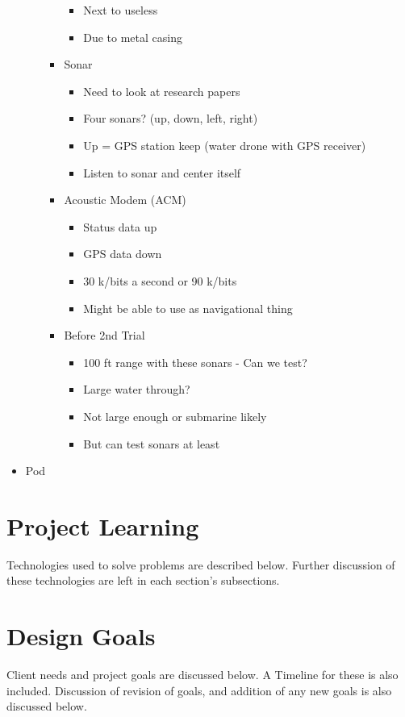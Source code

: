 \documentclass[12pt]{article}
\begin{document}
\begin{itemize}
\begin{itemize}
\begin{itemize}
\begin{itemize}
							\item Next to useless
							\item Due to metal casing
						\end{itemize}
						\item Sonar
						\begin{itemize}
							\item Need to look at research papers
							\item Four sonars? (up, down, left, right)
							\item Up = GPS station keep (water drone with GPS receiver)
							\item Listen to sonar and center itself
						\end{itemize}
						\item Acoustic Modem (ACM)
						\begin{itemize}
							\item Status data up
							\item GPS data down
							\item 30 k/bits a second or 90 k/bits
							\item Might be able to use as navigational thing
						\end{itemize}
						\item Before 2nd Trial
						\begin{itemize}
							\item 100 ft range with these sonars - Can we test?
							\item Large water through?
							\item Not large enough or submarine likely
							\item But can test sonars at least
						\end{itemize}
					\end{itemize}
				\end{itemize}
				\item Pod
				
			\end{itemize}

		\newpage

	\section{Project Learning}
	Technologies used to solve problems are described below. Further discussion of these technologies are left in each section's subsections.

		\newpage
		
	\section{Design Goals}
	Client needs and project goals are discussed below. A Timeline for these is also included. Discussion of revision of goals, and addition of any new goals is also discussed below.
	
\end{document}
